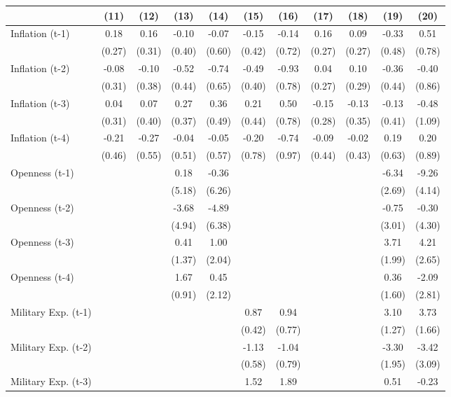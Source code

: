 \begin{tabular}{lcccccccccc}
\toprule
& (11) & (12) & (13) & (14) & (15) & (16) & (17) & (18) & (19) & (20) \\ 
\midrule
Inflation (t-1) & 0.18 & 0.16 & -0.10 & -0.07 & -0.15 & -0.14 & 0.16 & 0.09 & -0.33 & 0.51 \\
& (0.27) & (0.31) & (0.40) & (0.60) & (0.42) & (0.72) & (0.27) & (0.27) & (0.48) & (0.78) \\
Inflation (t-2) & -0.08 & -0.10 & -0.52 & -0.74 & -0.49 & -0.93 & 0.04 & 0.10 & -0.36 & -0.40 \\
& (0.31) & (0.38) & (0.44) & (0.65) & (0.40) & (0.78) & (0.27) & (0.29) & (0.44) & (0.86) \\
Inflation (t-3) & 0.04 & 0.07 & 0.27 & 0.36 & 0.21 & 0.50 & -0.15 & -0.13 & -0.13 & -0.48 \\
& (0.31) & (0.40) & (0.37) & (0.49) & (0.44) & (0.78) & (0.28) & (0.35) & (0.41) & (1.09) \\
Inflation (t-4) & -0.21 & -0.27 & -0.04 & -0.05 & -0.20 & -0.74 & -0.09 & -0.02 & 0.19 & 0.20 \\
& (0.46) & (0.55) & (0.51) & (0.57) & (0.78) & (0.97) & (0.44) & (0.43) & (0.63) & (0.89) \\
Openness (t-1) &  &  & 0.18 & -0.36 &  &  &  &  & -6.34 & -9.26 \\
&  &  & (5.18) & (6.26) &  &  &  &  & (2.69) & (4.14) \\
Openness (t-2) &  &  & -3.68 & -4.89 &  &  &  &  & -0.75 & -0.30 \\
&  &  & (4.94) & (6.38) &  &  &  &  & (3.01) & (4.30) \\
Openness (t-3) &  &  & 0.41 & 1.00 &  &  &  &  & 3.71 & 4.21 \\
&  &  & (1.37) & (2.04) &  &  &  &  & (1.99) & (2.65) \\
Openness (t-4) &  &  & 1.67 & 0.45 &  &  &  &  & 0.36 & -2.09 \\
&  &  & (0.91) & (2.12) &  &  &  &  & (1.60) & (2.81) \\
Military Exp. (t-1) &  &  &  &  & 0.87 & 0.94 &  &  & 3.10 & 3.73 \\
&  &  &  &  & (0.42) & (0.77) &  &  & (1.27) & (1.66) \\
Military Exp. (t-2) &  &  &  &  & -1.13 & -1.04 &  &  & -3.30 & -3.42 \\
&  &  &  &  & (0.58) & (0.79) &  &  & (1.95) & (3.09) \\
Military Exp. (t-3) &  &  &  &  & 1.52 & 1.89 &  &  & 0.51 & -0.23 \\

\end{tabular}
